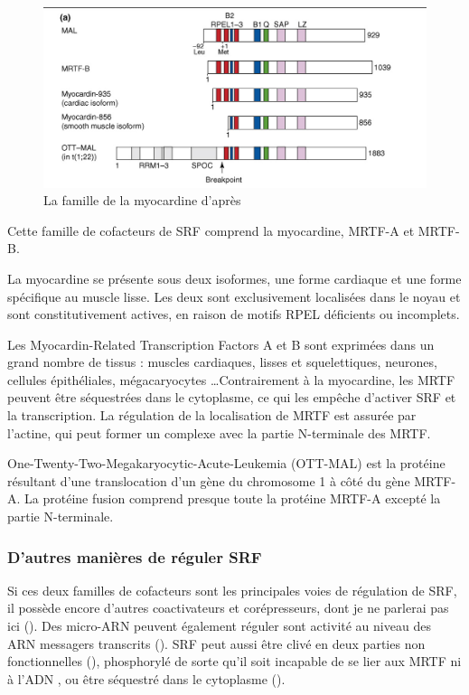 \begin{figure}[h!]
\includegraphics[scale=0.5]{MRTF_famille.png}
\caption{La famille de la myocardine d'après \cite{posern_actin_2006}}
\end{figure}
Cette famille de cofacteurs de SRF comprend la myocardine, MRTF-A et MRTF-B.

La myocardine se présente sous deux isoformes, une forme cardiaque et une forme spécifique au muscle lisse. Les deux sont exclusivement localisées dans le noyau et sont constitutivement actives, en raison de motifs RPEL déficients ou incomplets. 

Les Myocardin-Related Transcription Factors A et B sont exprimées dans un grand nombre de tissus : muscles cardiaques, lisses et squelettiques, neurones, cellules épithéliales, mégacaryocytes \dots Contrairement à la myocardine, les MRTF peuvent être séquestrées dans le cytoplasme, ce qui les empêche d'activer SRF et la transcription. La régulation de la localisation de MRTF est assurée par l'actine, qui peut former un complexe avec la partie N-terminale des MRTF. 

One-Twenty-Two-Megakaryocytic-Acute-Leukemia (OTT-MAL) est la protéine résultant d'une translocation d'un gène du chromosome 1 à côté du gène MRTF-A. La protéine fusion comprend presque toute la protéine MRTF-A excepté la partie N-terminale. 

\subsubsection{D'autres manières de réguler SRF}

Si ces deux familles de cofacteurs sont les principales voies de régulation de SRF, il possède encore d'autres coactivateurs et corépresseurs, dont je ne parlerai pas ici (\cite{posern_actin_2006}). Des micro-ARN peuvent également réguler sont activité au niveau des ARN messagers transcrits (\cite{chen_role_2006}). 
SRF peut aussi être clivé en deux parties non fonctionnelles  (\cite{drewett_serum_2001}), phosphorylé de sorte qu'il soit incapable de se lier aux MRTF ni à l'ADN \cite{iyer_novel_2003}, ou être séquestré dans le cytoplasme (\cite{lange_kinase_2005}).   


